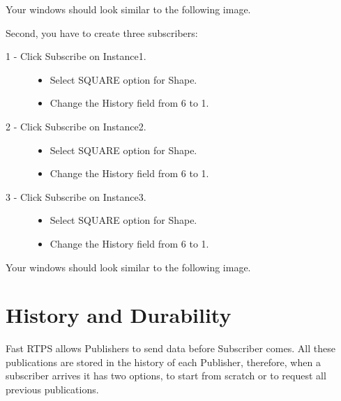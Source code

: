 \documentclass[letterpaper,10pt,english]{sphinxmanual}
\begin{document}
Your windows should look similar to the following image.


Second, you have to create three subscribers:
\begin{description}
\item[{1 - Click Subscribe on Instance1.}] \leavevmode\begin{itemize}
\item {} 
Select SQUARE option for Shape.

\item {} 
Change the History field from 6 to 1.

\end{itemize}

\item[{2 - Click Subscribe on Instance2.}] \leavevmode\begin{itemize}
\item {} 
Select SQUARE option for Shape.

\item {} 
Change the History field from 6 to 1.

\end{itemize}

\item[{3 - Click Subscribe on Instance3.}] \leavevmode\begin{itemize}
\item {} 
Select SQUARE option for Shape.

\item {} 
Change the History field from 6 to 1.

\end{itemize}

\end{description}

Your windows should look similar to the following image.



\chapter{History and Durability}
\label{\detokenize{history_durability:history-and-durability}}\label{\detokenize{history_durability::doc}}
Fast RTPS allows Publishers to send data before Subscriber comes. All these publications are stored in the history of each Publisher, therefore, when a subscriber arrives it has two options, to start from scratch or to request all previous publications.
\end{document}
